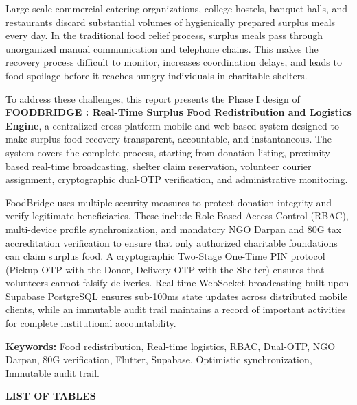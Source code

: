 \documentclass[12pt,a4paper]{article}
\begin{document}
\noindent
Large-scale commercial catering organizations, college hostels, banquet halls, and restaurants discard substantial volumes of hygienically prepared surplus meals every day. In the traditional food relief process, surplus meals pass through unorganized manual communication and telephone chains. This makes the recovery process difficult to monitor, increases coordination delays, and leads to food spoilage before it reaches hungry individuals in charitable shelters.

\vspace{0.4cm}
\noindent
To address these challenges, this report presents the Phase I design of \textbf{FOODBRIDGE : Real-Time Surplus Food Redistribution and Logistics Engine}, a centralized cross-platform mobile and web-based system designed to make surplus food recovery transparent, accountable, and instantaneous. The system covers the complete process, starting from donation listing, proximity-based real-time broadcasting, shelter claim reservation, volunteer courier assignment, cryptographic dual-OTP verification, and administrative monitoring.

\vspace{0.4cm}
\noindent
FoodBridge uses multiple security measures to protect donation integrity and verify legitimate beneficiaries. These include Role-Based Access Control (RBAC), multi-device profile synchronization, and mandatory NGO Darpan and 80G tax accreditation verification to ensure that only authorized charitable foundations can claim surplus food. A cryptographic Two-Stage One-Time PIN protocol (Pickup OTP with the Donor, Delivery OTP with the Shelter) ensures that volunteers cannot falsify deliveries. Real-time WebSocket broadcasting built upon Supabase PostgreSQL ensures sub-100ms state updates across distributed mobile clients, while an immutable audit trail maintains a record of important activities for complete institutional accountability.

\vspace{0.6cm}
\noindent
\textbf{Keywords:} Food redistribution, Real-time logistics, RBAC, Dual-OTP, NGO Darpan, 80G verification, Flutter, Supabase, Optimistic synchronization, Immutable audit trail.

\newpage
\thispagestyle{empty}
\begin{center}
    \vspace*{0.4cm}
    {\Large \textbf{LIST OF TABLES}}\\[0.8cm]
\end{center}
\end{document}
